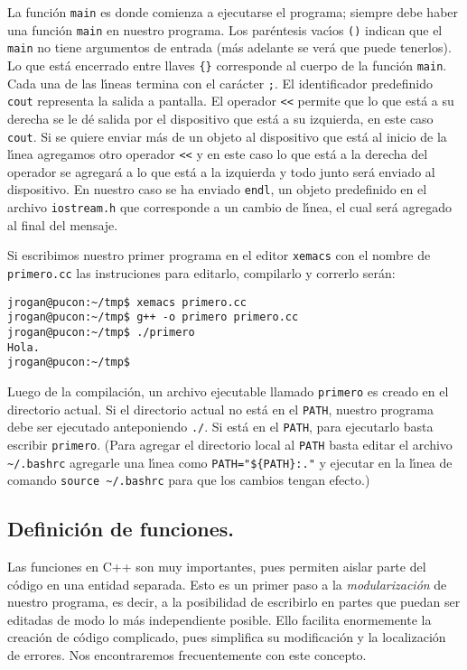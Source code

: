 La funci{\'o}n \verb+main+ es donde comienza a ejecutarse el programa;
siempre debe haber una funci{\'o}n \verb+main+ en nuestro programa.  Los
par{\'e}ntesis vac{\'\i}os \verb+()+ indican que el \verb+main+ no tiene
argumentos de entrada (m{\'a}s adelante se ver{\'a} que puede tenerlos).  Lo
que est{\'a} encerrado entre llaves \verb+{}+ corresponde al cuerpo de la
funci{\'o}n \verb|main|. Cada una de las l{\'\i}neas termina con el car\'acter
\verb+;+. El identificador predefinido \verb+cout+ representa la
salida a pantalla.  El operador \verb+<<+ permite que lo que est{\'a} a su
derecha se le d{\'e} salida por el dispositivo que est{\'a} a su izquierda, en
este caso \verb+cout+. Si se quiere enviar m{\'a}s de un objeto al
dispositivo que est{\'a} al inicio de la l{\'\i}nea agregamos otro operador
\verb+<<+ y en este caso lo que est{\'a} a la derecha del operador se
agregar{\'a} a lo que est{\'a} a la izquierda y todo junto ser{\'a} enviado al
dispositivo. En nuestro caso se ha enviado \verb+endl+, un objeto
predefinido en el archivo \verb+iostream.h+ que corresponde a un
cambio de l{\'\i}nea, el cual ser{\'a} agregado al final del mensaje.

Si escribimos nuestro primer programa en el editor \verb+xemacs+ con
el nombre de \verb|primero.cc| las instruciones para editarlo, compilarlo y correrlo
ser{\'a}n:
\begin{verbatim}
jrogan@pucon:~/tmp$ xemacs primero.cc 
jrogan@pucon:~/tmp$ g++ -o primero primero.cc 
jrogan@pucon:~/tmp$ ./primero
Hola.
jrogan@pucon:~/tmp$ 
\end{verbatim}


Luego de la compilaci\'on, un archivo ejecutable llamado
\verb+primero+ es creado en el directorio actual. Si el directorio
actual no est\'a en el \verb+PATH+, nuestro programa debe ser
ejecutado anteponiendo \verb+./+. Si est\'a en el \verb+PATH+, para
ejecutarlo basta escribir \verb+primero+. (Para agregar el
directorio local al \verb+PATH+
 basta editar el archivo \verb+~/.bashrc+
agregarle una l\'{\i}nea como
\verb+PATH="${PATH}:."+  y ejecutar en la l\'{\i}nea de comando 
\verb+source ~/.bashrc+ para que los cambios tengan efecto.)


\subsection{Definici{\'o}n de funciones.}
\label{funciones}

Las funciones en C++ son muy importantes, pues
permiten aislar parte del c\'odigo en una entidad separada. Esto es un
primer paso a la {\em modularizaci\'on\/} de nuestro programa, es
decir, a la posibilidad de escribirlo en partes que puedan ser
editadas de modo lo m\'as independiente posible. Ello facilita
enormemente la creaci\'on de c\'odigo complicado, pues simplifica su
modificaci\'on y la localizaci\'on de errores. Nos encontraremos
frecuentemente con este concepto.

